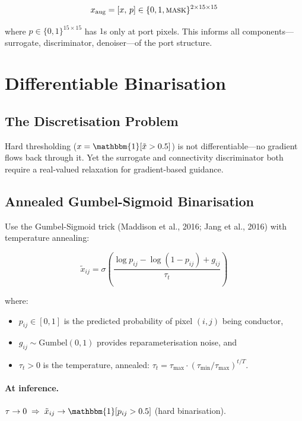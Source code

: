 \documentclass[12pt,a4paper]{article}
\newcommand{\xtilde}{\tilde{x}}
\theoremstyle{definition}
\theoremstyle{plain}
\theoremstyle{remark}
\begin{document}
\begin{equation}
  x_{\mathrm{aug}} = [x,\, p] \in \{0,1,\textsc{mask}\}^{2 \times 15 \times 15}
\end{equation}

where $p \in \{0,1\}^{15 \times 15}$ has $1$s only at port pixels.
This informs all components—surrogate, discriminator, denoiser—of the port structure.

\section{Differentiable Binarisation}
\label{sec:binarisation}

\subsection{The Discretisation Problem}

Hard thresholding ($x = \mathbbm{1}[\xtilde > 0.5]$) is not differentiable—no gradient
flows back through it.
Yet the surrogate and connectivity discriminator both require a real-valued relaxation
for gradient-based guidance.

\subsection{Annealed Gumbel-Sigmoid Binarisation}

Use the Gumbel-Sigmoid trick (Maddison et al., 2016; Jang et al., 2016) with
temperature annealing:

\begin{equation}
  \xtilde_{ij}
  = \sigma\!\left(
      \frac{\log p_{ij} - \log(1 - p_{ij}) + g_{ij}}{\tau_t}
    \right)
  \label{eq:gumbel}
\end{equation}

where:
\begin{itemize}
  \item $p_{ij} \in [0,1]$ is the predicted probability of pixel $(i,j)$ being conductor,
  \item $g_{ij} \sim \mathrm{Gumbel}(0,1)$ provides reparameterisation noise, and
  \item $\tau_t > 0$ is the temperature, annealed:
        $\tau_t = \tau_{\max} \cdot (\tau_{\min}/\tau_{\max})^{t/T}$.
\end{itemize}

\paragraph{At inference.}
$\tau \to 0 \;\Rightarrow\; \xtilde_{ij} \to \mathbbm{1}[p_{ij} > 0.5]$
(hard binarisation).
\end{document}
